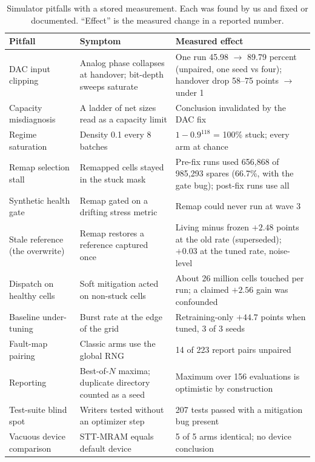 \documentclass[journal]{IEEEtran}
\begin{document}
\begin{table}[t]
\centering
\caption{Simulator pitfalls with a stored measurement. Each was found by us and fixed or documented. ``Effect'' is the measured change in a reported number.}
\label{tab:bugs}
\small
\begin{tabular}{p{3.4cm}p{5.7cm}p{6.6cm}}
\toprule
Pitfall & Symptom & Measured effect \\
\midrule
DAC input clipping & Analog phase collapses at handover; bit-depth sweeps saturate & One run 45.98 $\rightarrow$ 89.79 percent (unpaired, one seed vs four); handover drop 58--75 points $\rightarrow$ under 1
\\
Capacity misdiagnosis & A ladder of net sizes read as a capacity limit & Conclusion invalidated by the DAC fix
\\
Regime saturation & Density 0.1 every 8 batches & $1-0.9^{118}$ = 100\% stuck; every arm at chance
\\
Remap selection stall & Remapped cells stayed in the stuck mask & Pre-fix runs used 656,868 of 985,293 spares (66.7\%, with the gate bug); post-fix runs use all
\\
Synthetic health gate & Remap gated on a drifting stress metric & Remap could never run at wave 3
\\
Stale reference (the overwrite) & Remap restores a reference captured once & Living minus frozen $+2.48$ points at the old rate (superseded); $+0.03$ at the tuned rate, noise-level
\\
Dispatch on healthy cells & Soft mitigation acted on non-stuck cells & About 26 million cells touched per run; a claimed $+2.56$ gain was confounded
\\
Baseline under-tuning & Burst rate at the edge of the grid & Retraining-only $+44.7$ points when tuned, 3 of 3 seeds
\\
Fault-map pairing & Classic arms use the global RNG & 14 of 223 report pairs unpaired
\\
Reporting & Best-of-$N$ maxima; duplicate directory counted as a seed & Maximum over 156 evaluations is optimistic by construction
\\
Test-suite blind spot & Writers tested without an optimizer step & 207 tests passed with a mitigation bug present
\\
Vacuous device comparison & STT-MRAM equals default device & 5 of 5 arms identical; no device conclusion
\\
\bottomrule
\end{tabular}
\end{table}
\end{document}
